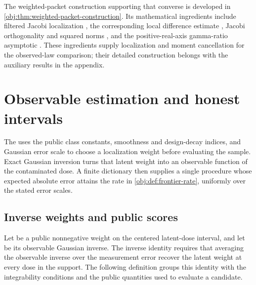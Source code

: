 \documentclass[11pt]{article}
\begin{document}
The weighted-packet construction supporting that converse is developed in \cref{obj:thm:weighted-packet-construction}. Its mathematical ingredients include filtered Jacobi localization \citep[Theorem 2.4, equation (2.14)]{PetrushevXu2005}, the corresponding local difference estimate \citep[Theorem 2.2, equation (2.4)]{https://people.math.sc.edu/pencho/Publications/kpx-06-28-06-web.pdf}, Jacobi orthogonality and squared norms \citep[Table 18.3.1, Jacobi row and caption]{https://dlmf.nist.gov/18.3}, and the positive-real-axis gamma-ratio asymptotic \citep[equation (5.11.12)]{https://dlmf.nist.gov/5.11.E12}. These ingredients supply localization and moment cancellation for the observed-law comparison; their detailed construction belongs with the auxiliary results in the appendix.


\section{Observable estimation and honest intervals}

The  uses the public class constants, smoothness and design-decay indices, and Gaussian error scale to choose a localization weight before evaluating the sample. Exact Gaussian inversion turns that latent weight into an observable function of the contaminated dose. A finite dictionary then supplies a single procedure whose expected absolute error attains the rate in \cref{obj:def:frontier-rate}, uniformly over the stated error scales.

\subsection{Inverse weights and public scores}

Let  be a public nonnegative weight on the centered latent-dose interval, and let  be its observable Gaussian inverse. The inverse identity requires that averaging the observable inverse over the measurement error recover the latent weight at every dose in the support. The following definition groups this identity with the integrability conditions and the public quantities used to evaluate a candidate.
\end{document}
